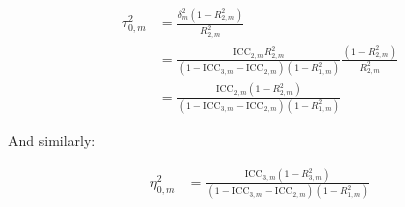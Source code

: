 \documentclass[12pt]{article}
\begin{document}
\begin{align*}
\tau^2_{0,m}  &= \frac{\delta_m^2(1 - R_{2,m}^2)}{R_{2,m}^2}\\
&= \frac{\text{ICC}_{2,m}R_{2,m}^2}{(1 - \text{ICC}_{3,m}- \text{ICC}_{2,m})(1-R_{1,m}^2)}\frac{(1 - R_{2,m}^2)}{R_{2,m}^2}\\
&= \frac{\text{ICC}_{2,m}(1-R_{2,m}^2)}{(1 - \text{ICC}_{3,m}- \text{ICC}_{2,m})(1-R_{1,m}^2)}
\end{align*}

And similarly:

\begin{align*}
\eta^2_{0,m} &= \frac{\text{ICC}_{3,m}(1-R_{3,m}^2)}{(1 - \text{ICC}_{3,m}- \text{ICC}_{2,m})(1-R_{1,m}^2)}
\end{align*}




%
\end{document}
